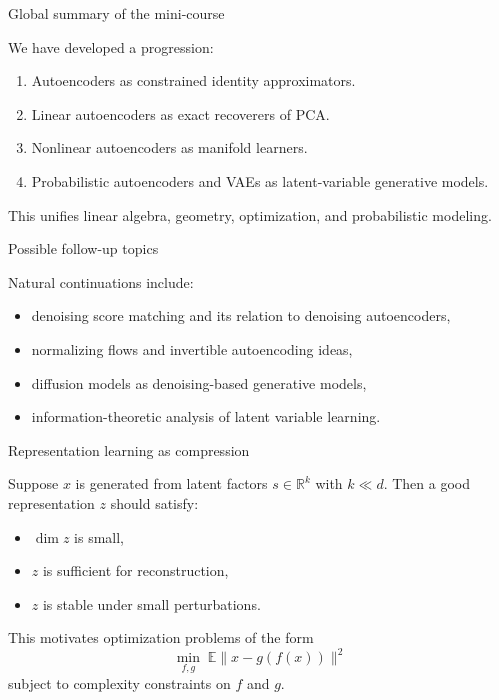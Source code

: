 \documentclass[aspectratio=169]{beamer}
\begin{document}
\begin{frame}{Global summary of the mini-course}

We have developed a progression:
\begin{enumerate}
\item Autoencoders as constrained identity approximators.
\item Linear autoencoders as exact recoverers of PCA.
\item Nonlinear autoencoders as manifold learners.
\item Probabilistic autoencoders and VAEs as latent-variable generative models.
\end{enumerate}

This unifies linear algebra, geometry, optimization, and probabilistic modeling.

\end{frame}

\begin{frame}{Possible follow-up topics}

Natural continuations include:
\begin{itemize}
\item denoising score matching and its relation to denoising autoencoders,
\item normalizing flows and invertible autoencoding ideas,
\item diffusion models as denoising-based generative models,
\item information-theoretic analysis of latent variable learning.
\end{itemize}

\end{frame}

\begin{frame}{Representation learning as compression}

Suppose \(x\) is generated from latent factors \(s\in\mathbb{R}^k\) with \(k\ll d\).
Then a good representation \(z\) should satisfy:
\begin{itemize}
\item \(\dim z\) is small,
\item \(z\) is sufficient for reconstruction,
\item \(z\) is stable under small perturbations.
\end{itemize}
This motivates optimization problems of the form
\[
\min_{f,g}\; \mathbb{E}\|x-g(f(x))\|^2
\]
subject to complexity constraints on \(f\) and \(g\).

\end{frame}
\end{document}
